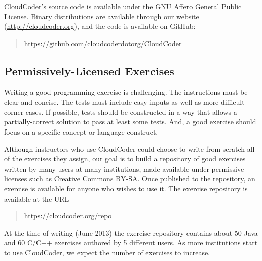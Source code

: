 \documentclass{sig-alternate}
\begin{document}
CloudCoder's source code is available under the GNU Affero General Public License\cite{AGPL}.
Binary distributions are available through our website (\url{http://cloudcoder.org}),
and the code is available on GitHub:
\begin{quote}
\url{https://github.com/cloudcoderdotorg/CloudCoder}
\end{quote}


\subsection{Permissively-Licensed Exercises}

Writing a good programming exercise is challenging.
The instructions must be clear and concise.  The tests must
include easy inputs as well as more difficult corner cases.
If possible, tests should be constructed in a way that
allows a partially-correct solution to pass at least some
tests.  And, a good exercise should focus on a specific concept
or language construct.


Although instructors who use CloudCoder
could choose to write from scratch all of the exercises they assign,
our goal is to build a repository of good exercises
written by many users at many institutions, made available under
permissive licenses such as Creative Commons BY-SA\cite{CC-BY-SA}.
Once published to the repository, an exercise is available
for anyone who wishes to use it.
The exercise repository is available at the URL
\begin{quote}
\url{https://cloudcoder.org/repo}
\end{quote}
%
At the time of writing (June 2013) the exercise repository contains about 50 Java and
60 C/C++ exercises authored by 5 different users.  As more institutions
start to use CloudCoder, we expect the number of exercises to increase.
\end{document}
